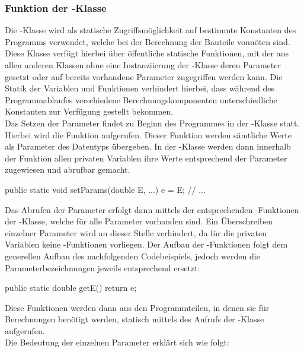 \subsubsection{Funktion der -Klasse}
Die -Klasse wird als statische Zugriffsmöglichkeit auf bestimmte Konstanten des Programms verwendet, welche bei der Berechnung der Bauteile vonnöten sind.
Diese Klasse verfügt hierbei über öffentliche statische Funktionen, mit der aus allen anderen Klassen ohne eine Instanziierung der -Klasse deren Parameter gesetzt oder auf bereits vorhandene Parameter zugegriffen werden kann.
Die Statik der Variablen und Funktionen verhindert hierbei, dass während des Programmablaufes verschiedene  Berechnungskomponenten unterschiedliche Konstanten zur Verfügung gestellt bekommen. \\
Das Setzen der Parameter findet zu Beginn des Programmes in der -Klasse statt.
Hierbei wird die Funktion  aufgerufen.
Dieser Funktion werden sämtliche Werte als Parameter des Datentyps  übergeben.
In der -Klasse werden dann innerhalb der Funktion allen privaten Variablen ihre Werte entsprechend der Parameter zugewiesen und abrufbar gemacht.\\

\begin{code} 
	public static void setParams(double E, ...){
		e = E;
		// ...
	}
\end{code}

Das Abrufen der Parameter erfolgt dann mittels der entsprechenden -Funktionen der -Klasse, welche für alle Parameter vorhanden sind.
Ein Überschreiben einzelner Parameter wird an dieser Stelle verhindert, da für die privaten Variablen keine -Funktionen vorliegen.
Der Aufbau der -Funktionen folgt dem generellen Aufbau des nachfolgenden Codebeispiels, jedoch werden die Parameterbezeichnungen jeweils entsprechend ersetzt:\\

\begin{code} 
public static double getE() {
	return e;
}
\end{code}

Diese Funktionen werden dann aus den Programmteilen, in denen sie für Berechnungen benötigt werden, statisch mittels des Aufrufs der -Klasse aufgerufen. \\
Die Bedeutung der einzelnen Parameter erklärt sich wie folgt:

